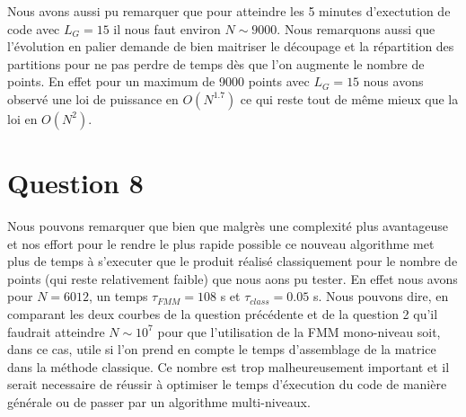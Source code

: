 \documentclass[10pt]{article}
\begin{document}
\begin{multicols}{2}
\indent
Nous avons aussi pu remarquer que pour atteindre les 5 minutes d'exectution de code avec $L_G = 15$ il nous faut environ $N \sim 9000$. Nous remarquons aussi que l'évolution en palier demande de bien maitriser le découpage et la répartition des partitions pour ne pas perdre de temps dès que l'on augmente le nombre de points. En effet pour un maximum de 9000 points avec $L_G = 15$ nous avons observé une loi de puissance en $O(N^{1.7})$ ce qui reste tout de même mieux que la loi en $O(N^{2})$.


\vspace*{22pt}
\section*{Question 8}

Nous pouvons remarquer que bien que malgrès une complexité plus avantageuse et nos effort pour le rendre le plus rapide possible ce nouveau algorithme met plus de temps à s'executer que le produit réalisé classiquement pour le nombre de points (qui reste relativement faible) que nous aons pu tester. En effet nous avons pour $N = 6012$, un temps $\tau_{FMM} = 108$ s et $\tau_{class} = 0.05$ s. Nous pouvons dire, en comparant les deux courbes de la question précédente  et de la question 2 qu'il faudrait atteindre $N \sim 10^{7}$ pour que l'utilisation de la FMM mono-niveau soit, dans ce cas, utile si l'on prend en compte le temps d'assemblage de la matrice dans la méthode classique. Ce nombre est trop malheureusement important et il serait necessaire de réussir à optimiser le temps d'éxecution du code de manière générale ou de passer par un algorithme multi-niveaux.








\end{multicols}
\end{document}
